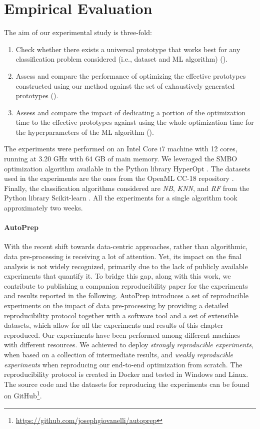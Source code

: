\section{Empirical Evaluation}
\label{effective-sec:evaluation}


The aim of our experimental study is three-fold:
\begin{enumerate}
    \item Check whether there exists a universal prototype that works best for any classification problem considered  (i.e., dataset and ML algorithm) ().
    \item Assess and compare the performance of optimizing the effective prototypes constructed using our method against the set of exhaustively generated prototypes ().
    \item Assess and compare the impact of dedicating a portion of the optimization time to the effective prototypes against using the whole optimization time for the hyperparameters of the ML algorithm ().
\end{enumerate}

The experiments were performed on an Intel Core i7 machine with 12 cores, running at 3.20 GHz with 64 GB of main memory.
We leveraged the SMBO optimization algorithm available in the Python library HyperOpt \cite{bergstra2015hyperopt}.
The datasets used in the experiments are the ones from the OpenML CC-18 repository \cite{OpenML2013}.
Finally, the classification algorithms considered are \textit{NB}, \textit{KNN}, and \textit{RF} from the Python library Scikit-learn \cite{scikit-learn}.
All the experiments for a single algorithm took approximately two weeks.


\paragraph{AutoPrep}
With the recent shift towards data-centric approaches, rather than algorithmic, data pre-processing is receiving a lot of attention.
Yet, its impact on the final analysis is not widely recognized, primarily due to the lack of publicly available experiments that quantify it.
To bridge this gap, along with this work, we contribute to publishing a companion reproducibility paper \cite{Giovanelli2022IS} for the experiments and results reported in the following.
AutoPrep introduces a set of reproducible experiments on the impact of data pre-processing by providing a detailed reproducibility protocol together with a software tool and a set of extensible datasets, which allow for all the experiments and results of this chapter reproduced.
Our experiments have been performed among different machines with different resources.
We achieved to deploy \textit{strongly reproducible experiments}, when based on a collection of intermediate results, and \textit{weakly reproducible experiments} when reproducing our end-to-end optimization from scratch.
The reproducibility protocol is created in Docker and tested in Windows and Linux.
The source code and the datasets for reproducing the experiments can be found on GitHub\footnote{
\url{https://github.com/josephgiovanelli/autoprep}}.

